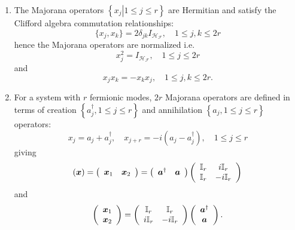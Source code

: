 \documentclass[aps,preprint]{revtex4}%
\begin{document}
\begin{enumerate}
\item The Majorana operators $\left\{  \left.  x_{j}\right\vert 1\leq j\leq
r\right\}  $ are Hermitian and satisfy the Clifford algebra commutation
relationships:
\[
\{x_{j},x_{k}\}=2\delta_{jk}I_{\mathcal{H}_{\mathcal{F}}},\quad1\leq j,k\leq2r
\]
hence the Majorana operators are normalized i.e.
\begin{equation}
x_{j}^{2}=I_{\mathcal{H}_{\mathcal{F}}},\quad1\leq j\leq2r
\end{equation}
and%
\begin{equation}
x_{j}x_{k}=-x_{k}x_{j},\quad1\leq j,k\leq2r.
\end{equation}


\item For a system with $r$ fermionic modes, $2r$ Majorana operators are
defined in terms of creation $\left\{  a_{j}^{\dagger},1\leq j\leq r\right\}
$ and annihilation $\left\{  a_{j},1\leq j\leq r\right\}  $ operators:
\[
x_{j}=a_{j}+a_{j}^{\dagger},\quad x_{j+r}=-i(a_{j}-a_{j}^{\dagger}),\quad1\leq
j\leq r
\]
giving
\begin{equation}
\left(  \boldsymbol{x}\right)  =\left(
\begin{array}
[c]{cc}%
\boldsymbol{x}_{1} & \boldsymbol{x}_{2}%
\end{array}
\right)  =\left(
\begin{array}
[c]{cc}%
\boldsymbol{a}^{\dagger} & \boldsymbol{a}%
\end{array}
\right)  \left(
\begin{array}
[c]{cc}%
\mathbb{I}_{r} & i\mathbb{I}_{r}\\
\mathbb{I}_{r} & -i\mathbb{I}_{r}%
\end{array}
\right)
\end{equation}
and
\begin{equation}
\left(
\begin{array}
[c]{c}%
\boldsymbol{x}_{1}\\
\boldsymbol{x}_{2}%
\end{array}
\right)  =\left(
\begin{array}
[c]{cc}%
\mathbb{I}_{r} & \mathbb{I}_{r}\\
i\mathbb{I}_{r} & -i\mathbb{I}_{r}%
\end{array}
\right)  \left(
\begin{array}
[c]{c}%
\boldsymbol{a}^{\dagger}\\
\boldsymbol{a}%
\end{array}
\right)  .
\end{equation}



\end{enumerate}
\end{document}
